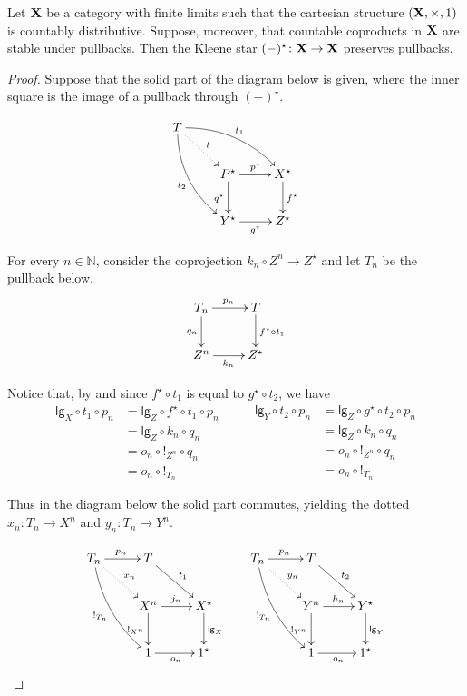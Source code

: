 \documentclass[runningheads,envcountsect]{llncs}
\newcommand{\lgh}{\mathsf{lg}}
\def\X{\textbf {\textup{X}}}
\begin{document}
\begin{proposition}
	Let $\X$ be a category with finite limits such that the cartesian structure $(\X, \times, 1)$ is countably distributive. Suppose, moreover, that countable  coproducts in $\X$ are stable under pullbacks. Then the Kleene star $(-)^\star \colon \X\to \X$ preserves pullbacks.
\end{proposition}
\begin{proof}
 Suppose that the solid part of the diagram below is given, where  the inner square is the image of a pullback through $(-)^\star$.
 
 \[\xymatrix{T \ar@/^.4cm/[drr]^{t_1} \ar@/_.4cm/[ddr]_{t_2} \ar@{.>}[dr]^t\\ & P^\star  \ar[d]_{q^\star}\ar[r]^{p^\star}& X^\star \ar[d]^{f^\star} \\ & Y^\star\ar[r]_{g^\star} & Z^\star}\]
	
	
	For every $n\in \mathbb{N}$, consider the coprojection $k_n\circ Z^n\to Z^\star$ and let $T_n$ be the pullback below.
	\[\xymatrix{T_n \ar[r]^{p_n} \ar[d]_{q_n} & T  \ar[d]^{f^\star \circ t_1}\\
	Z^n \ar[r]_{k_n}& Z^\star}\]
	
	Notice that, by  and since $f^\star \circ t_1$ is equal to $g^\star \circ t_2$, we have
	\[
	\begin{split}
		\lgh_X\circ t_1 \circ p_n&=\lgh_Z\circ f^\star \circ t_1\circ p_n\\&=\lgh_Z\circ k_n\circ q_n\\&=o_n\circ !_{Z^n}\circ q_n\\&=o_n\circ !_{T_n}
	\end{split}\qquad \begin{split}
		\lgh_Y\circ t_2 \circ p_n&=\lgh_Z\circ g^\star \circ t_2\circ p_n\\&=\lgh_Z\circ k_n\circ q_n\\&=o_n\circ !_{Z^n}\circ q_n\\&=o_n\circ !_{T_n}
	\end{split}\]
	
	Thus in the diagram below the solid part commutes, yielding the dotted $x_n\colon T_n\to X^n$ and $y_n\colon T_n\to Y^n$.
	
	\[\xymatrix{T_n  \ar@/_.3cm/[ddr]_{!_{T_n}}\ar@{.>}[dr]^{x_n} \ar[r]^{p_n} & T \ar[dr]^{t_1}&& T_n \ar@/_.3cm/[ddr]_{!_{T_n}} \ar[r]^{p_n} \ar@{.>}[dr]^{y_n}& T \ar[dr]^{t_2}\\ &X^n   \ar[d]_{!_{X^n}}\ar[r]^{j_n}& X^\star \ar[d]^{\lgh_X}& & Y^n \ar[d]_{!_{Y^n}}  \ar[r]^{h_n}& Y^\star \ar[d]^{\lgh_Y}\\ & 1 \ar[r]_{o_n}& 1^\star && 1  \ar[r]_{o_n}& 1^\star}\]
	

\end{proof}
\end{document}

